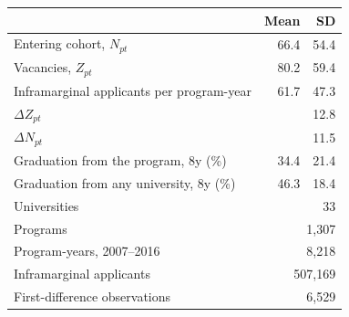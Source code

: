 \begin{tabular}{lrr}
\toprule
 & Mean & SD \\
\midrule
Entering cohort, \(N_{pt}\) &   66.4 &   54.4 \\
Vacancies, \(Z_{pt}\) &   80.2 &   59.4 \\
Inframarginal applicants per program-year &   61.7 &   47.3 \\
\(\Delta Z_{pt}\) & &   12.8 \\
\(\Delta N_{pt}\) & &   11.5 \\
Graduation from the program, 8y (\%) &   34.4 &   21.4 \\
Graduation from any university, 8y (\%) &   46.3 &   18.4 \\
\midrule
Universities & \multicolumn{2}{r}{    33} \\
Programs & \multicolumn{2}{r}{ 1,307} \\
Program-years, 2007--2016 & \multicolumn{2}{r}{ 8,218} \\
Inframarginal applicants & \multicolumn{2}{r}{  507,169} \\
First-difference observations & \multicolumn{2}{r}{ 6,529} \\
\bottomrule
\end{tabular}
